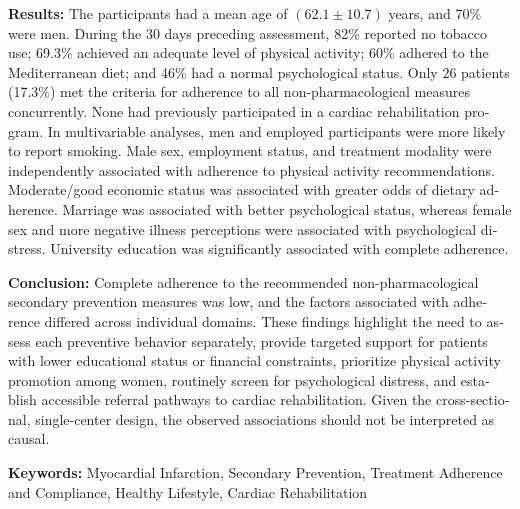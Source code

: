 \begin{latin}
\vspace{0.45em}
\noindent\textbf{Results:}
The participants had a mean age of $(62.1 \pm 10.7)$ years, and 70\% were men. During the 30 days preceding assessment, 82\% reported no tobacco use; 69.3\% achieved an adequate level of physical activity; 60\% adhered to the Mediterranean diet; and 46\% had a normal psychological status. Only 26 patients (17.3\%) met the criteria for adherence to all non-pharmacological measures concurrently. None had previously participated in a cardiac rehabilitation program. In multivariable analyses, men and employed participants were more likely to report smoking. Male sex, employment status, and treatment modality were independently associated with adherence to physical activity recommendations. Moderate/good economic status was associated with greater odds of dietary adherence. Marriage was associated with better psychological status, whereas female sex and more negative illness perceptions were associated with psychological distress. University education was significantly associated with complete adherence.

\vspace{0.45em}
\noindent\textbf{Conclusion:}
Complete adherence to the recommended non-pharmacological secondary prevention measures was low, and the factors associated with adherence differed across individual domains. These findings highlight the need to assess each preventive behavior separately, provide targeted support for patients with lower educational status or financial constraints, prioritize physical activity promotion among women, routinely screen for psychological distress, and establish accessible referral pathways to cardiac rehabilitation. Given the cross-sectional, single-center design, the observed associations should not be interpreted as causal.

\vspace{0.8em}
\noindent\textbf{Keywords:} \KeywordsEN
Myocardial Infarction, Secondary Prevention, Treatment Adherence and Compliance, Healthy Lifestyle, Cardiac Rehabilitation
\end{latin}
\clearpage
